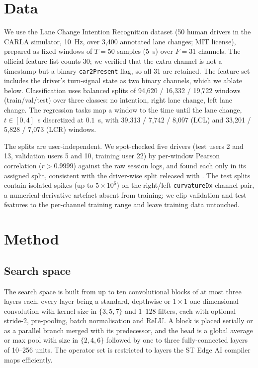 \documentclass[journal]{IEEEtran}
\begin{document}
\section{Data}
We use the Lane Change Intention Recognition dataset
\cite{lcdataset, forneris2024dmir} (50 human drivers in the CARLA simulator,
10~Hz, over 3{,}400 annotated lane
changes; MIT license), prepared as fixed windows of $T{=}50$ samples
(5~s) over $F{=}31$ channels. The official feature list counts 30; we verified
that the extra channel is not a timestamp but a binary \texttt{car2Present}
flag, so all 31 are retained. The feature set includes the driver's turn-signal
state as two binary channels, which we ablate below. Classification uses balanced splits of 94{,}620 / 16{,}332 /
19{,}722 windows (train/val/test) over three classes: no intention, right
lane change, left lane change. The regression tasks map a window to the time
until the lane change, $t \in [0, 4]$~s discretized at $0.1$~s, with
39{,}313 / 7{,}742 / 8{,}097 (LCL) and 33{,}201 / 5{,}828 / 7{,}073 (LCR)
windows.

The splits are user-independent. We spot-checked five drivers (test users 2 and
13, validation users 5 and 10, training user 22) by per-window Pearson
correlation ($r>0.9999$) against the raw session logs, and found each only in
its assigned split, consistent with the driver-wise split released with
\cite{lcintention2026}.
The test splits contain isolated spikes (up to $5\times10^{6}$) on the
right/left \texttt{curvatureDx} channel pair, a numerical-derivative
artefact absent from training; we clip validation and test features to the
per-channel training range and leave training data untouched.

\section{Method}
\subsection{Search space}
The search space is built from up to ten convolutional blocks of at most three
layers each, every layer being a standard, depthwise or $1\times1$
one-dimensional convolution with kernel size in $\{3,5,7\}$ and 1--128 filters,
each with optional stride-2, pre-pooling, batch normalisation and ReLU. A block
is placed serially or as a parallel branch merged with its predecessor, and the
head is a global average or max pool with size in $\{2,4,6\}$ followed by one to
three fully-connected layers of 10--256 units. The operator set is restricted to
layers the ST Edge AI compiler maps efficiently.
\end{document}
